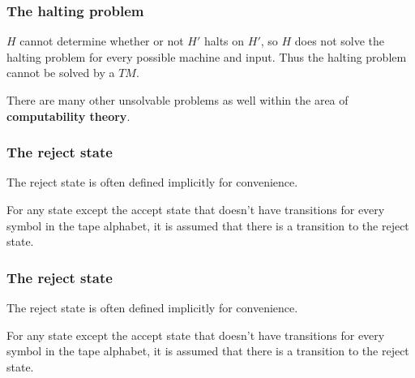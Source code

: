 \documentclass[aspectratio=169]{beamer}
\begin{document}
\begin{frame}
\frametitle{The halting problem}

$H$ cannot determine whether or not $H'$ halts on $H'$, so $H$ does not solve the halting problem for every possible machine and input. Thus the halting problem cannot be solved by a $TM$.

There are many other unsolvable problems as well within the area of {\bf computability theory}.

\end{frame}

\begin{frame}
\frametitle{The reject state}

The reject state is often defined implicitly for convenience.

For any state except the accept state that doesn't have transitions for every symbol in the tape alphabet, it is assumed that there is a transition to the reject state.

\begin{center}
\end{center}
\end{frame}

\begin{frame}[noframenumbering]
\frametitle{The reject state}

The reject state is often defined implicitly for convenience.

For any state except the accept state that doesn't have transitions for every symbol in the tape alphabet, it is assumed that there is a transition to the reject state.

\begin{center}
\end{center}
\end{frame}
\end{document}
